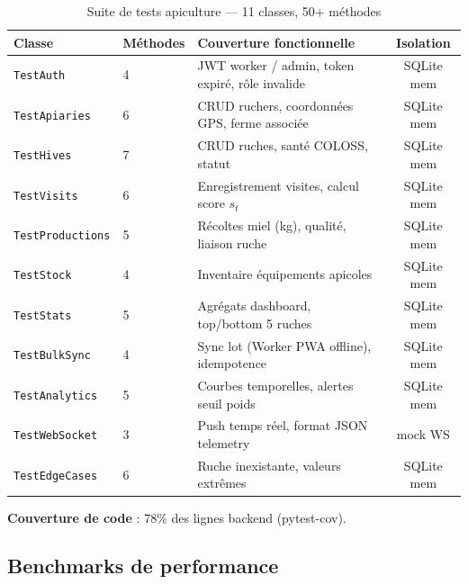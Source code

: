\documentclass[12pt,a4paper,twoside]{report}
\begin{document}
\begin{table}[H]
\caption{Suite de tests apiculture — 11 classes, 50+ méthodes}
\label{tab:bee_tests}
\centering
\begin{tabularx}{\textwidth}{@{}l l X c@{}}
\toprule
\textbf{Classe} & \textbf{Méthodes} & \textbf{Couverture fonctionnelle} & \textbf{Isolation} \\
\midrule
\texttt{TestAuth}         & 4  & JWT worker / admin, token expiré, rôle invalide & SQLite mem \\
\texttt{TestApiaries}     & 6  & CRUD ruchers, coordonnées GPS, ferme associée   & SQLite mem \\
\texttt{TestHives}        & 7  & CRUD ruches, santé COLOSS, statut               & SQLite mem \\
\texttt{TestVisits}       & 6  & Enregistrement visites, calcul score $s_t$      & SQLite mem \\
\texttt{TestProductions}  & 5  & Récoltes miel (kg), qualité, liaison ruche      & SQLite mem \\
\texttt{TestStock}        & 4  & Inventaire équipements apicoles                 & SQLite mem \\
\texttt{TestStats}        & 5  & Agrégats dashboard, top/bottom 5 ruches         & SQLite mem \\
\texttt{TestBulkSync}     & 4  & Sync lot (Worker PWA offline), idempotence      & SQLite mem \\
\texttt{TestAnalytics}    & 5  & Courbes temporelles, alertes seuil poids        & SQLite mem \\
\texttt{TestWebSocket}    & 3  & Push temps réel, format JSON telemetry          & mock WS \\
\texttt{TestEdgeCases}    & 6  & Ruche inexistante, valeurs extrêmes             & SQLite mem \\
\bottomrule
\end{tabularx}
\end{table}

\textbf{Couverture de code} : 78\% des lignes backend (pytest-cov).

\subsection{Benchmarks de performance}
\end{document}

